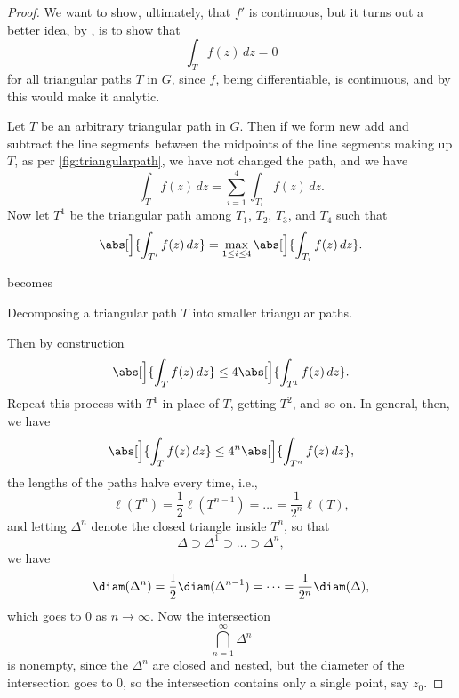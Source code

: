 \begin{proof}
	We want to show, ultimately, that $f'$ is continuous, but it turns out a better idea, by , is to show that
	\[
		\int_T f(z) \, d z = 0
	\]
	for all triangular paths $T$ in $G$, since $f$, being differentiable, is continuous, and by  this would make it analytic.

	Let $T$ be an arbitrary triangular path in $G$.
	Then if we form new add and subtract the line segments between the midpoints of the line segments making up $T$, as per \autoref{fig:triangularpath}, we have not changed the path, and we have
	\[
		\int_T f(z) \, d z = \sum_{i = 1}^4 \int_{T_i} f(z) \, d z.
	\]
	Now let $T^1$ be the triangular path among $T_1$, $T_2$, $T_3$, and $T_4$ such that
	\[
		\abs[\Big]{\int_{T'} f(z) \, d z} = \max_{1 \leq i \leq 4} \abs[\Big]{\int_{T_i} f(z) \, d z}.
	\]

	\begin{marginfigure}
		\centering

		becomes


		\caption{\label{fig:triangularpath} Decomposing a triangular path $T$ into smaller triangular paths.}
	\end{marginfigure}

	Then by construction
	\[
		\abs[\Big]{\int_T f(z) \, d z} \leq 4 \abs[\Big]{\int_{T^1} f(z) \, d z}.
	\]
	Repeat this process with $T^1$ in place of $T$, getting $T^2$, and so on.
	In general, then, we have
	\[
		\abs[\Big]{\int_T f(z) \, d z} \leq 4^n \abs[\Big]{\int_{T^n} f(z) \, d z},
	\]
	the lengths of the paths halve every time, i.e.,
	\[
		\ell(T^n) = \frac{1}{2} \ell(T^{n - 1}) = \dots = \frac{1}{2^n} \ell(T),
	\]
	and letting $\Delta^n$ denote the closed triangle inside $T^n$, so that
	\[
		\Delta \supset \Delta^1 \supset \dots \supset \Delta^n,
	\]
	we have
	\[
		\diam(\Delta^n) = \frac{1}{2} \diam(\Delta^{n - 1}) = \dots = \frac{1}{2^n} \diam(\Delta),
	\]
	which goes to $0$ as $n \to \infty$.
	Now the intersection
	\[
		\bigcap_{n = 1}^\infty \Delta^n
	\]
	is nonempty, since the $\Delta^n$ are closed and nested, but the diameter of the intersection goes to $0$, so the intersection contains only a single point, say $z_0$.


\end{proof}
